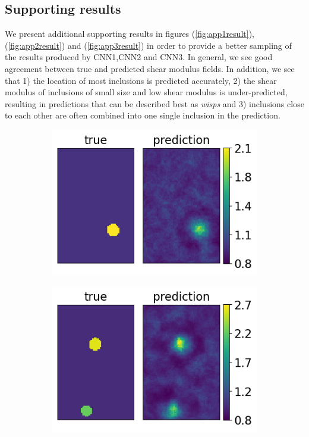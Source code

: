 \documentclass[12pt]{article}
\newcommand{\nhgappwidth}{0.24\linewidth}
\newcommand{\nhgappheight}{2.9cm}
\begin{document}
\begin{appendices}
\section{\label{sect:appendix1} Supporting results}
We present additional supporting results in figures (\ref{fig:app1result}),(\ref{fig:app2result}) and (\ref{fig:app3result}) in order to provide a better sampling of the results produced by CNN1,CNN2 and CNN3. In general, we see good agreement between true and predicted shear modulus fields. In addition, we see that 1) the location of most inclusions is predicted accurately, 2) the shear modulus of inclusions of small size and low shear modulus is under-predicted, resulting in predictions that can be described best as \textit{wisps} and 3) inclusions close to each other are often combined into one single inclusion in the prediction. 
\begin{figure}[!h]
  \centering
  \begin{subfigure}[c]{\nhgappwidth}
    \centering    
    \includegraphics[totalheight=\nhgappheight]{Figures/AppendixNew/CNN1/ex5/mu.png}
  \end{subfigure}
  \begin{subfigure}[c]{\nhgappwidth}
    \centering    
    \includegraphics[totalheight=\nhgappheight]{Figures/AppendixNew/CNN1/ex6/mu.png}

\end{subfigure}
\end{figure}
\end{appendices}
\end{document}
